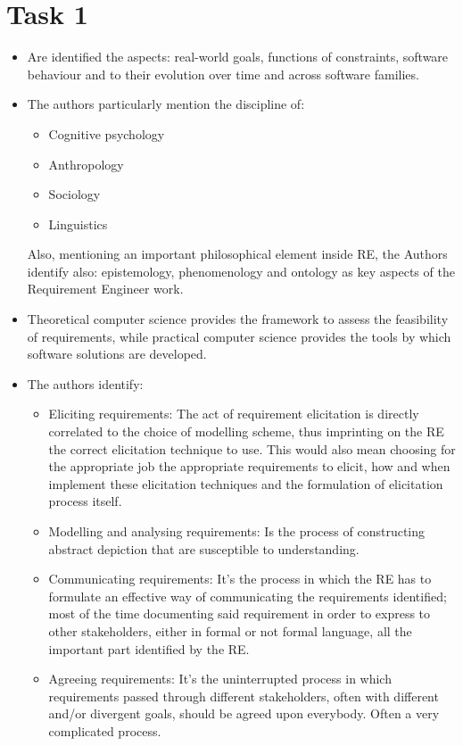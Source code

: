 \chapter{Task 1}
\begin{itemize}
	\item Are identified the aspects: real-world goals, functions of constraints, software behaviour and to their evolution over time and across software families.
	\item The authors particularly mention the discipline of:
	\begin{itemize}
		\item Cognitive psychology
		\item Anthropology
		\item Sociology
		\item Linguistics
	\end{itemize}
	Also, mentioning an important philosophical element inside RE, the Authors identify also: epistemology, phenomenology and ontology as key aspects of the Requirement Engineer work.
	\item Theoretical computer science provides the framework to assess the feasibility of requirements, while practical computer science provides the tools by which software solutions are developed.
	\item The authors identify:
	\begin{itemize}
		\item Eliciting requirements: The act of requirement elicitation is directly correlated to the choice of modelling scheme, thus imprinting on the RE the correct elicitation technique to use. This would also mean choosing for the appropriate job the appropriate requirements to elicit, how and when implement these elicitation techniques and the formulation of elicitation process itself.
		\item Modelling and analysing requirements: Is the process of constructing abstract depiction that are susceptible to understanding. 
		\item Communicating requirements: It's the process in which the RE has to formulate an effective way of communicating the requirements identified; most of the time documenting said requirement in order to express to other stakeholders, either in formal or not formal language, all the important part identified by the RE. 
		\item Agreeing requirements: It's the uninterrupted process in which requirements passed through different stakeholders, often with different and/or divergent goals, should be agreed upon everybody. Often a very complicated process.

\end{itemize}
\end{itemize}
